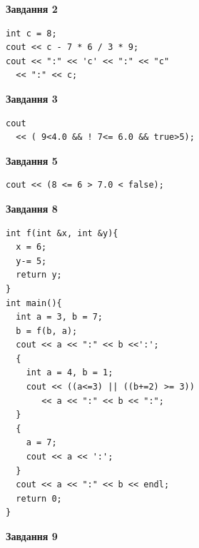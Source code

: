 \documentclass[12pt, ukrainian]{article}
\begin{document}
{\begin {large}
\begin{minipage}[t]{7.0cm}
\end{minipage}
\vline \hspace{1mm}
\begin{minipage}[t]{11.0cm}

\begin{center}
\textbf{Завдання 2}
\end{center}
\vspace{-8mm}

\begin{verbatim}
int c = 8;
cout << c - 7 * 6 / 3 * 9;
cout << ":" << 'c' << ":" << "c" 
  << ":" << c;
\end{verbatim}



\begin{center}
\textbf{Завдання 3}
\end{center}
\vspace{-8mm}

\begin{verbatim}
cout 
  << ( 9<4.0 && ! 7<= 6.0 && true>5);
\end{verbatim}



\begin{center}
\textbf{Завдання 5}
\end{center}
\vspace{-8mm}

\begin{verbatim}
cout << (8 <= 6 > 7.0 < false);
\end{verbatim}



\begin{center}
\textbf{Завдання 8}
\end{center}
\vspace{-8mm}

\begin{verbatim}
int f(int &x, int &y){
  x = 6;
  y-= 5;
  return y;
}
int main(){
  int a = 3, b = 7;
  b = f(b, a);
  cout << a << ":" << b <<':';
  {
    int a = 4, b = 1;
    cout << ((a<=3) || ((b+=2) >= 3))
       << a << ":" << b << ":";
  }
  {
    a = 7;
    cout << a << ':';
  }
  cout << a << ":" << b << endl;
  return 0;
}
\end{verbatim}

\end{minipage}


\begin{minipage}[t]{7.0cm}

\begin{center}
\textbf{Завдання 9}
\end{center}
\vspace{-8mm}


\end{minipage}
\end{large}}
\end{document}
